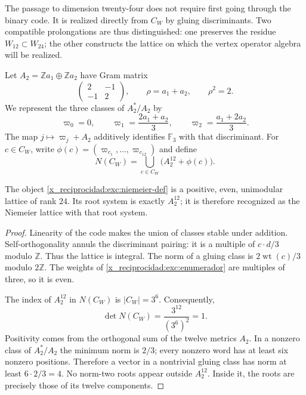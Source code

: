The passage to dimension twenty-four does not require first going through the
binary code. It is realized directly from $C_W$ by gluing
discriminants. Two compatible prolongations are thus distinguished:
one preserves the residue $W_{12}\subset W_{24}$; the other constructs the
lattice on which the vertex operator algebra will be realized.

Let $A_2=\mathbb Z a_1\oplus\mathbb Z a_2$ have Gram matrix
\[
 \begin{pmatrix}2&-1\\-1&2\end{pmatrix},
 \qquad \rho=a_1+a_2,\qquad \rho^2=2.
\]
We represent the three classes of $A_2^*/A_2$ by
\[
 \varpi_0=0,\qquad
 \varpi_1=\frac{2a_1+a_2}{3},\qquad
 \varpi_2=\frac{a_1+2a_2}{3}.
\]
The map $j\mapsto\varpi_j+A_2$ additively identifies
$\mathbb F_3$ with that discriminant. For $c\in C_W$, write
$\phi(c)=(\varpi_{c_1},\ldots,\varpi_{c_{12}})$ and define
\begin{equation}
 N(C_W)=\bigcup_{c\in C_W}\bigl(A_2^{12}+\phi(c)\bigr).
 \label{x_reciprocidad:exc:niemeier-def}
\end{equation}

\begin{theorem}
\label{x_reciprocidad:exc:niemeier-teorema}
The object \eqref{x_reciprocidad:exc:niemeier-def} is a positive, even,
unimodular lattice of rank $24$. Its root system is exactly
$A_2^{12}$; it is therefore recognized as the Niemeier lattice with
that root system.
\end{theorem}

\begin{proof}
Linearity of the code makes the union of classes stable under
addition. Self-orthogonality annuls the discriminant pairing:
it is a multiple of $c\cdot d/3$ modulo $\mathbb Z$. Thus the
lattice is integral. The norm of a gluing class is
$2\operatorname{wt}(c)/3$ modulo $2\mathbb Z$. The weights of
\eqref{x_reciprocidad:exc:enumerador} are multiples of three, so it is even.

The index of $A_2^{12}$ in $N(C_W)$ is $|C_W|=3^6$. Consequently,
\[
 \det N(C_W)=\frac{3^{12}}{(3^6)^2}=1.
\]
Positivity comes from the orthogonal sum of the twelve metrics $A_2$.
In a nonzero class of $A_2^*/A_2$ the minimum norm is $2/3$;
every nonzero word has at least six nonzero positions.
Therefore a vector in a nontrivial gluing class has norm
at least $6\cdot2/3=4$. No norm-two roots appear outside
$A_2^{12}$. Inside it, the roots are precisely those of its
twelve components.
\end{proof}

